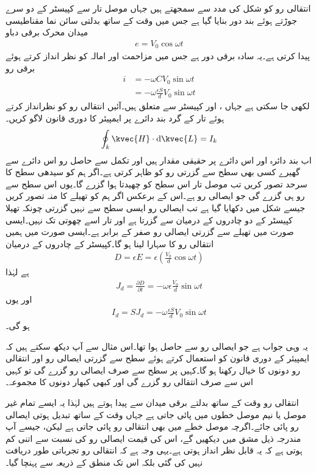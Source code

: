 انتقالی رو کو شکل  کی مدد سے سمجھتے ہیں جہاں موصل تار سے کپیسٹر  کے دو سرے جوڑتے ہوئے بند دور بنایا گیا ہے جس میں وقت کے ساتھ بدلتی سائن نما مقناطیسی میدان  محرک برقی دباو
\begin{align*}
e=V_0 \cos \omega t
\end{align*}
 پیدا کرتی ہے۔یہ سادہ برقی دور ہے جس میں مزاحمت اور امالہ کو نظر انداز کرتے ہوئے برقی رو
\begin{align*}
i&=-\omega C V_0 \sin \omega t\\
&=-\omega \frac{\epsilon S}{d} V_0 \sin \omega t
\end{align*}
لکھی جا سکتی ہے جہاں ،  اور  کپیسٹر سے متعلق ہیں۔آئیں انتقالی رو کو نظرانداز کرتے ہوئے تار کے گرد بند دائرے   پر ایمپیئر کا دوری قانون لاگو کریں۔
\begin{align*}
\oint_k \kvec{H} \cdot \dif \kvec{L}=I_k
\end{align*}
اب بند دائرہ  اور اس دائرے پر  حقیقی مقدار ہیں اور تکمل سے حاصل رو  اس دائرے سے گھیرے کسی بھی سطح سے گزرتی رو کو ظاہر کرتی ہے۔اگر ہم  کو سیدھی سطح کا سرحد تصور کریں تب موصل تار اس سطح کو چھیدتا ہوا گزرے گا۔یوں اس سطح سے  رو ہی گزرے گی جو ایصالی رو ہے۔اس کے برعکس اگر ہم  کو تھیلے کا منہ تصور کریں جیسے شکل میں دکھایا گیا ہے تب ایصالی رو ایسی سطح سے نہیں گزرتی چونکہ تھیلا کپیسٹر کے دو چادروں کے درمیان سے گزرتا ہے اور تار اسے چھوتی تک نہیں۔ایسی صورت میں تھیلے سے گزرتی ایصالی رو صفر کے برابر ہے۔ایسی صورت میں ہمیں انتقالی رو کا سہارا لینا ہو گا۔کپیسٹر کے چادروں کے درمیان
\begin{align*}
D=\epsilon E=\epsilon \left(\frac{V_0}{d} \cos \omega t \right)
\end{align*}
ہے لہٰذا
\begin{align*}
J_d=\frac{\partial D}{\partial t}=-\omega \epsilon \frac{V_0}{d} \sin \omega t
\end{align*}
اور یوں
\begin{align*}
I_d=S J_d =-\omega \frac{\epsilon  S}{d} V_0\sin \omega t 
\end{align*}
ہو گی۔

یہ وہی جواب ہے جو ایصالی رو سے حاصل ہوا تھا۔اس مثال سے آپ دیکھ سکتے ہیں کہ ایمپیئر کے دوری قانون کو استعمال کرتے ہوئے سطح سے  گزرتی ایصالی رو اور انتقالی رو دونوں کا خیال رکھنا ہو گا۔کہیں پر سطح سے صرف ایصالی رو گزرے گی تو کہیں اس سے صرف انتقالی رو گزرے گی اور کبھی کبھار دونوں کا مجموعہ۔

انتقالی رو وقت کے ساتھ بدلتے برقی میدان سے پیدا ہوتے ہیں لہٰذا یہ ایسے تمام غیر موصل یا نیم موصل خطوں میں پائی جاتی ہے جہاں وقت کے ساتھ تبدیل ہوتی ایصالی رو پائی جائے۔اگرچہ موصل خطے میں بھی انتقالی رو پائی جاتی ہے لیکن، جیسے آپ مندرجہ ذیل مشق میں دیکھیں گے، اس کی قیمت ایصالی رو کی نسبت سے اتنی کم ہوتی ہے کہ یہ قابل نظر انداز ہوتی ہے۔یہی وجہ ہے کہ انتقالی رو تجرباتی طور دریافت نہیں کی گئی بلکہ اس تک منطق کے ذریعہ سے پہنچا گیا۔

